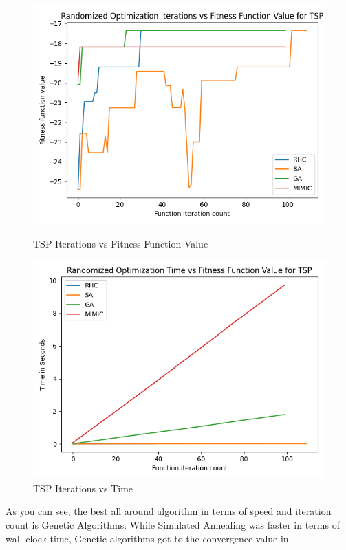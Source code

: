 \documentclass[11pt]{article}
\begin{document}
    \begin{figure}
        \begin{minipage}{0.5\textwidth}
            \centering
            \includegraphics[width=0.9\linewidth]{tsp1.png}
            \caption{TSP Iterations vs Fitness Function Value}\label{Fig:TSP Iterations vs Fitness Function Value}
        \end{minipage}\hfill
        \begin{minipage}{0.5\textwidth}
            \centering
            \includegraphics[width=0.9\linewidth]{tsp2.png}
            \caption{TSP Iterations vs Time}\label{Fig:TSP Iterations vs Time}
        \end{minipage}
    \end{figure}
    As you can see, the best all around algorithm in terms of speed and iteration count is Genetic Algorithms.
    While Simulated Annealing was faster in terms of wall clock time, Genetic algorithms got to the convergence value in
\end{document}

